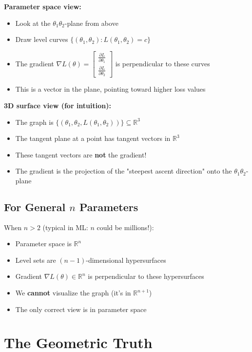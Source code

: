 \begin{notechapter}
\textbf{Parameter space view:}
\begin{itemize}
    \item Look at the $\theta_1\theta_2$-plane from above
    \item Draw level curves $\{(\theta_1, \theta_2) : L(\theta_1, \theta_2) = c\}$
    \item The gradient $\nabla L(\theta) = \begin{bmatrix} \frac{\partial L}{\partial \theta_1} \\ \frac{\partial L}{\partial \theta_2} \end{bmatrix}$ is perpendicular to these curves
    \item This is a vector in the plane, pointing toward higher loss values
\end{itemize}

\textbf{3D surface view (for intuition):}
\begin{itemize}
    \item The graph is $\{(\theta_1, \theta_2, L(\theta_1, \theta_2))\} \subseteq \mathbb{R}^3$
    \item The tangent plane at a point has tangent vectors in $\mathbb{R}^3$
    \item These tangent vectors are \textbf{not} the gradient!
    \item The gradient is the projection of the "steepest ascent direction" onto the $\theta_1\theta_2$-plane
\end{itemize}

\subsection{For General $n$ Parameters}

When $n > 2$ (typical in ML: $n$ could be millions!):
\begin{itemize}
    \item Parameter space is $\mathbb{R}^n$
    \item Level sets are $(n-1)$-dimensional hypersurfaces
    \item Gradient $\nabla L(\theta) \in \mathbb{R}^n$ is perpendicular to these hypersurfaces
    \item We \textbf{cannot} visualize the graph (it's in $\mathbb{R}^{n+1}$)
    \item The only correct view is in parameter space
\end{itemize}

\section{The Geometric Truth}


\end{notechapter}
